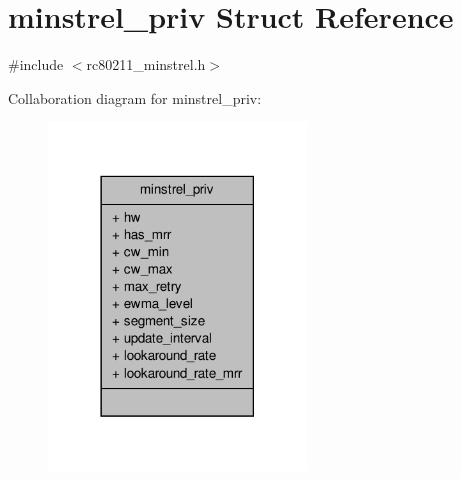 \hypertarget{structminstrel__priv}{\section{minstrel\-\_\-priv Struct Reference}
\label{structminstrel__priv}
}


{\ttfamily \#include $<$rc80211\-\_\-minstrel.\-h$>$}



Collaboration diagram for minstrel\-\_\-priv\-:
\nopagebreak
\begin{figure}[H]
\begin{center}
\leavevmode
\includegraphics[width=194pt]{structminstrel__priv__coll__graph}
\end{center}
\end{figure}
